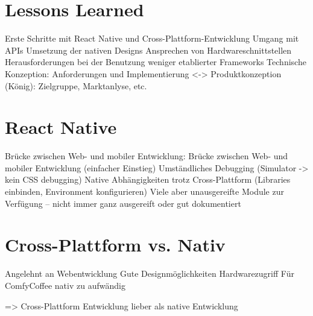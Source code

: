 \section{Lessons Learned}
Erste Schritte mit React Native und Cross-Plattform-Entwicklung
Umgang mit APIs
Umsetzung der nativen Designs
Ansprechen von Hardwareschnittstellen
Herausforderungen bei der Benutzung weniger etablierter Frameworks
Technische Konzeption: Anforderungen und Implementierung <-> Produktkonzeption (König): Zielgruppe, Marktanlyse, etc.




\section{React Native}
Brücke zwischen Web- und mobiler Entwicklung: Brücke zwischen Web- und mobiler Entwicklung (einfacher Einstieg)
Umständliches Debugging (Simulator -> kein CSS debugging)
Native Abhängigkeiten trotz Cross-Plattform (Libraries einbinden, Environment konfigurieren)
Viele aber unausgereifte Module zur Verfügung – nicht immer ganz ausgereift oder gut dokumentiert


\section{Cross-Plattform vs. Nativ}
Angelehnt an Webentwicklung
Gute Designmöglichkeiten
Hardwarezugriff
Für ComfyCoffee nativ zu aufwändig

=> Cross-Plattform Entwicklung lieber als native Entwicklung